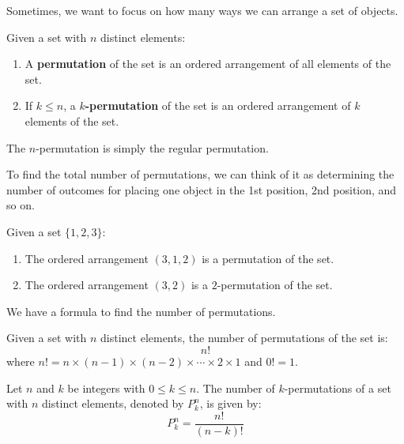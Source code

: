 \documentclass{huhtakm-template-book-v2}
\begin{document}
    Sometimes, we want to focus on how many ways we can arrange a set of objects.
    \begin{defn}
        Given a set with $n$ distinct elements:
        \begin{enumerate}
            \item A \textbf{permutation} of the set is an ordered arrangement of all elements of the set.
            \item If $k \leq n$, a \textbf{$k$-permutation} of the set is an ordered arrangement of $k$ elements of the set.
        \end{enumerate}
    \end{defn}
    \begin{rem}
        The $n$-permutation is simply the regular permutation.
    \end{rem}
    \begin{rem}
        To find the total number of permutations, we can think of it as determining the number of outcomes for placing one object in the 1st position, 2nd position, and so on.
    \end{rem}
    \begin{eg}
        Given a set $\{1,2,3\}$:
        \begin{enumerate}
            \item The ordered arrangement $(3,1,2)$ is a permutation of the set.
            \item The ordered arrangement $(3,2)$ is a $2$-permutation of the set.
        \end{enumerate}
    \end{eg}
    We have a formula to find the number of permutations.
    \begin{thm}
        Given a set with $n$ distinct elements, the number of permutations of the set is:
        \begin{equation*}
            n!
        \end{equation*}
        where $n! = n\times(n-1)\times(n-2)\times\cdots\times 2\times 1$ and $0! = 1$.
    \end{thm}
    \begin{thm}
        Let $n$ and $k$ be integers with $0 \leq k \leq n$. The number of $k$-permutations of a set with $n$ distinct elements, denoted by $P_{k}^{n}$, is given by:
        \begin{equation*}
            P_{k}^{n} = \frac{n!}{(n-k)!}
        \end{equation*}
    \end{thm}
\end{document}
